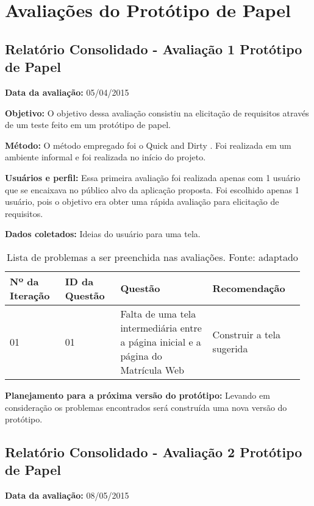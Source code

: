 \chapter{Avaliações do Protótipo de Papel}

\section{Relatório Consolidado - Avaliação 1 Protótipo de Papel}

\textbf{Data da avaliação:} 05/04/2015

\textbf{Objetivo:}
O objetivo dessa avaliação consistiu na elicitação de requisitos através de um teste feito em um protótipo de papel.

\textbf{Método:}
O método empregado foi o Quick and Dirty \cite{preece}. Foi realizada em um ambiente informal e foi realizada no início do projeto.

\textbf{Usuários e perfil:}
Essa primeira avaliação foi realizada apenas com 1 usuário que se encaixava no público alvo da aplicação proposta. Foi escolhido apenas 1 usuário, pois o objetivo era obter uma rápida avaliação para elicitação de requisitos.

\textbf{Dados coletados:}
Ideias do usuário para uma tela.

\begin{table*}[!h]
\caption{Lista de problemas a ser preenchida nas avaliações. Fonte: \cite{preece} adaptado}
\label{tab:problema}
  \begin{tabular}{p{0.18\linewidth}p{0.18\linewidth}p{0.30\linewidth}p{0.30\linewidth}}
  \hline
    Nº da Iteração & ID da Questão & Questão & Recomendação\\
 \hline
    01 & 01 & Falta de uma tela intermediária entre a página inicial e a página do Matrícula Web & Construir a tela sugerida\\
  \end{tabular}
\end{table*}

\textbf{Planejamento para a próxima versão do protótipo:}
Levando em consideração os problemas encontrados será construída uma nova versão do protótipo. 
\vfill
\pagebreak

\section{Relatório Consolidado - Avaliação 2 Protótipo de Papel}

\textbf{Data da avaliação:} 08/05/2015

